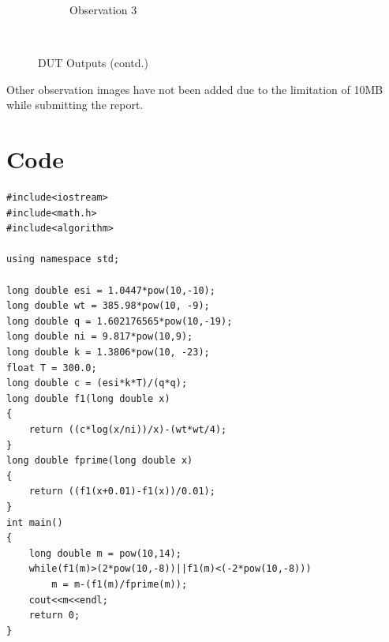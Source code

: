 \documentclass[12pt]{article}
\begin{document}
\begin{center}
\begin{figure}[H]
\begin{subfigure}[b]{\linewidth}
		\caption{Observation 3}
	\end{subfigure}\\
	\caption{DUT Outputs (contd.)}
\end{figure}
\end{center}

Other observation images have not been added due to the limitation of 10MB while submitting the report.

\section{Code}
\begin{verbatim}
#include<iostream>
#include<math.h>
#include<algorithm>

using namespace std;

long double esi = 1.0447*pow(10,-10);
long double wt = 385.98*pow(10, -9);
long double q = 1.602176565*pow(10,-19);
long double ni = 9.817*pow(10,9);
long double k = 1.3806*pow(10, -23);
float T = 300.0;
long double c = (esi*k*T)/(q*q);
long double f1(long double x)
{
    return ((c*log(x/ni))/x)-(wt*wt/4);
}
long double fprime(long double x)
{
    return ((f1(x+0.01)-f1(x))/0.01);
}
int main()
{
    long double m = pow(10,14);
    while(f1(m)>(2*pow(10,-8))||f1(m)<(-2*pow(10,-8)))
        m = m-(f1(m)/fprime(m));
    cout<<m<<endl;
    return 0;
}
\end{verbatim}
\end{document}

